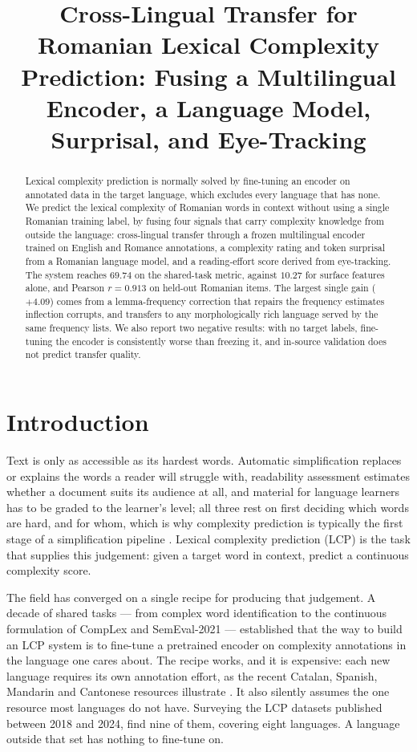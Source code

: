 \documentclass[11pt]{article}
\title{Cross-Lingual Transfer for Romanian Lexical Complexity Prediction:
Fusing a Multilingual Encoder, a Language Model, Surprisal, and Eye-Tracking}
\author{}
\begin{document}
\maketitle
\begin{abstract}
Lexical complexity prediction is normally solved by fine-tuning an
encoder on annotated data in the target language, which excludes every
language that has none. We predict the lexical complexity of Romanian
words in context without using a single Romanian training label, by
fusing four signals that carry complexity knowledge from outside the
language: cross-lingual transfer through a frozen multilingual encoder
trained on English and Romance annotations, a complexity rating and
token surprisal from a Romanian language model, and a reading-effort
score derived from eye-tracking. The system reaches $69.74$ on the
shared-task metric, against $10.27$ for surface features alone, and
Pearson $r = 0.913$ on held-out Romanian items. The largest single gain
($+4.09$) comes from a lemma-frequency correction that repairs the
frequency estimates inflection corrupts, and transfers to any
morphologically rich language served by the same frequency lists. We
also report two negative results: with no target labels, fine-tuning
the encoder is consistently worse than freezing it, and in-source
validation does not predict transfer quality.
\end{abstract}

\section{Introduction}
\label{section:intro}

Text is only as accessible as its hardest words. Automatic simplification
replaces or explains the words a reader will struggle with, readability
assessment estimates whether a document suits its audience at all, and
material for language learners has to be graded to the learner's level;
all three rest on first deciding which words are hard, and for whom,
which is why complexity prediction is typically the first stage of a
simplification pipeline \citep{qiu-etal-2024-complex}. Lexical complexity
prediction (LCP) is the task that supplies this judgement: given a target
word in context, predict a continuous complexity score.

The field has converged on a single recipe for producing that judgement.
A decade of shared tasks --- from complex word identification
\citep{yimam-etal-2018-report} to the continuous formulation of CompLex
and SemEval-2021 \citep{shardlow-etal-2021-semeval} --- established that
the way to build an LCP system is to fine-tune a pretrained encoder on
complexity annotations in the language one cares about. The recipe works,
and it is expensive: each new language requires its own annotation
effort, as the recent Catalan, Spanish, Mandarin and Cantonese resources
illustrate \citep{saggion-etal-2024-lexical, qiu-etal-2024-complex}. It
also silently assumes the one resource most languages do not have.
Surveying the LCP datasets published between 2018 and 2024,
\citet{shardlow-etal-2024-multilingual} find nine of them, covering eight
languages. A language outside that set has nothing to fine-tune on.
\end{document}
